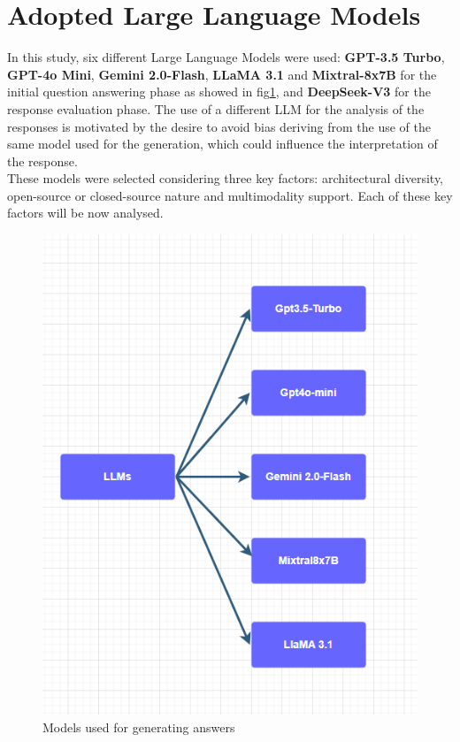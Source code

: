 \section{Adopted Large Language Models}
In this study, six different Large Language Models were used: \textbf{GPT-3.5 Turbo}, \textbf{GPT-4o Mini}, \textbf{Gemini 2.0-Flash}, \textbf{LLaMA 3.1} and \textbf{Mixtral-8x7B} for the initial question answering phase as showed in fig\ref{fig:models}, and \textbf{DeepSeek-V3} for the response evaluation phase. The use of a different LLM for the analysis of the responses is motivated by the desire to avoid bias deriving from the use of the same model used for the generation, which could influence the interpretation of the response.
\\These models were selected considering three key factors: architectural diversity, open-source or closed-source nature and multimodality support. Each of these key factors will be now analysed.
\begin{figure}[h]
    \centering
    \includegraphics[width=0.7\linewidth]{Figures/Models.png}
    \caption{Models used for generating answers}
    \label{fig:models}
\end{figure}
